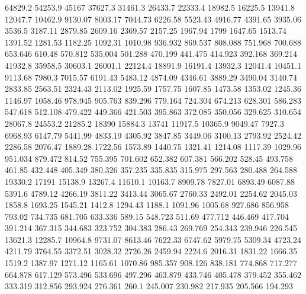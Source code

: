 64829.2      54253.9      45167      37627.3      31461.3      26433.7      22333.4      18982.5      16225.5      13941.8      12047.7      10462.9      9130.07      8003.17      7044.73      6226.58      5523.43      4916.77      4391.65      3935.06      3536.5      3187.11      2879.85      2609.16      2369.57      2157.25      1967.94      1799      1647.65      1513.74      1391.52      1281.53      1182.25      1092.31      1010.98      936.932      869.537      808.088      751.968      700.688      653.646      610.48      570.812      535.004      501.288      470.199      441.475      414.923      392.168      369.214      
41932.8      35958.5      30603.1      26001.1      22124.4      18891.9      16191.4      13932.3      12041.4      10451.1      9113.68      7980.3      7015.57      6191.43      5483.12      4874.09      4346.61      3889.29      3490.04      3140.74      2833.85      2563.51      2324.43      2113.02      1925.59      1757.75      1607.85      1473.58      1353.02      1245.36      1146.97      1058.46      978.945      905.763      839.296      779.164      724.304      674.213      628.301      586.283      547.618      512.108      479.422      449.366      421.503      395.863      372.085      350.056      329.625      310.654      
28067.8      24553.2      21285.2      18390      15884.3      13741      11917.5      10365.9      9049.47      7927.3      6968.93      6147.79      5441.99      4833.19      4305.92      3847.85      3449.06      3100.13      2793.92      2524.42      2286.58      2076.47      1889.28      1722.56      1573.89      1440.75      1321.41      1214.08      1117.39      1029.96      951.034      879.472      814.52      755.395      701.602      652.382      607.381      566.202      528.45      493.758      461.85      432.448      405.349      380.326      357.235      335.835      315.975      297.563      280.488      264.588      
19330.2      17191      15138.9      13267.4      11610.1      10163.7      8909.78      7827.01      6893.49      6087.88      5391.6      4789.12      4266.19      3811.22      3413.44      3065.67      2760.33      2492.01      2254.62      2045.03      1858.8      1693.25      1545.21      1412.8      1294.43      1188.1      1091.96      1005.68      927.686      856.958      793.02      734.735      681.705      633.336      589.15      548.723      511.69      477.712      446.469      417.704      391.214      367.315      344.683      323.752      304.383      286.43      269.769      254.343      239.946      226.545      
13621.3      12285.7      10964.8      9731.07      8613.46      7622.33      6747.62      5979.75      5309.34      4723.24      4211.79      3764.55      3372.51      3028.32      2726.26      2459.94      2224.6      2016.31      1831.22      1666.35      1519.2      1387.97      1271.12      1165.61      1070.86      985.357      908.126      838.181      774.868      717.277      664.878      617.129      573.496      533.696      497.296      463.879      433.746      405.478      379.452      355.462      333.319      312.856      293.924      276.361      260.1      245.007      230.982      217.935      205.566      194.293      
